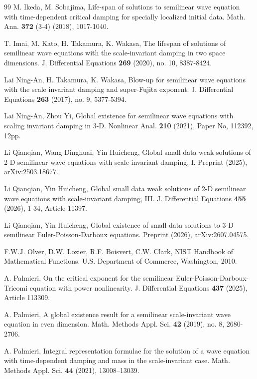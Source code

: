 \documentclass[11pt,twoside]{article}
\theoremstyle{plain}
\theoremstyle{definition}
\theoremstyle{remark}
\numberwithin{equation}{section}
\begin{document}
\begin{thebibliography}{99}
M. Ikeda, M. Sobajima, Life-span of solutions to semilinear wave equation with time-dependent critical damping for specially
localized initial data. Math. Ann. \textbf{372} (3-4) (2018), 1017-1040.

 T. Imai, M. Kato, H. Takamura, K. Wakasa,
The lifespan of solutions of semilinear wave equations with the scale-invariant damping in two space dimensions.
J. Differential Equations \textbf{269} (2020), no. 10, 8387-8424.




Lai Ning-An, H. Takamura, K. Wakasa, Blow-up for semilinear wave equations with the scale invariant damping and super-Fujita exponent.
J. Differential Equations \textbf{263} (2017),  no. 9, 5377-5394.

Lai Ning-An, Zhou Yi, Global existence for semilinear wave equations with scaling invariant damping in 3-D.
Nonlinear Anal. \textbf{210} (2021), Paper No, 112392, 12pp.



 Li Qianqian, Wang Dinghuai, Yin Huicheng,
Global small data weak solutions of 2-D semilinear wave equations
with  scale-invariant  damping, I.  Preprint (2025), arXiv:2503.18677.

 Li Qianqian, Yin Huicheng, Global small data weak solutions of 2-D semilinear wave equations
with scale-invariant damping, III. J. Differential Equations \textbf{455} (2026), 1-34, Article 11397.

 Li Qianqian, Yin Huicheng, Global existence of small data solutions to 3-D semilinear Euler-Poisson-Darboux equations. Preprint (2026), arXiv:2607.04575.




F.W.J. Olver, D.W. Lozier, R.F. Boisvert, C.W. Clark, NIST Handbook of Mathematical Functions. U.S. Department
of Commerce, Washington, 2010.


 A. Palmieri,
On the critical exponent for the semilinear Euler-Poisson-Darboux-Tricomi equation with power nonlinearity.
J. Differential Equations \textbf{437} (2025), Article 113309.

A. Palmieri, A global existence result for a semilinear scale-invariant wave equation in even dimension.
 Math. Methods Appl. Sci. \textbf{42} (2019), no. 8, 2680-2706.

A. Palmieri,
Integral representation formulae for the solution of a wave equation
with time-dependent damping and mass in the scale-invariant case.
Math. Methods Appl. Sci. \textbf{44} (2021), 13008--13039.


\end{thebibliography}
\end{document}
